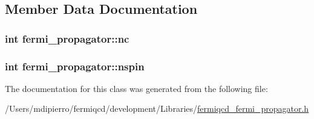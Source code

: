 \subsection{Member Data Documentation}
\hypertarget{classfermi__propagator_a75d862433489db5a07b2ced97c21f9cc}{
\subsubsection[{nc}]{\setlength{\rightskip}{0pt plus 5cm}int {\bf fermi\_\-propagator::nc}}}
\label{classfermi__propagator_a75d862433489db5a07b2ced97c21f9cc}
\hypertarget{classfermi__propagator_a5eae6edf77379e878f84281aa9e32316}{
\subsubsection[{nspin}]{\setlength{\rightskip}{0pt plus 5cm}int {\bf fermi\_\-propagator::nspin}}}
\label{classfermi__propagator_a5eae6edf77379e878f84281aa9e32316}


The documentation for this class was generated from the following file:\begin{DoxyCompactItemize}
\item 
/Users/mdipierro/fermiqcd/development/Libraries/\hyperlink{fermiqcd__fermi__propagator_8h}{fermiqcd\_\-fermi\_\-propagator.h}\end{DoxyCompactItemize}
